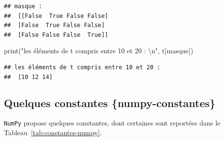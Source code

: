 \documentclass[12pt,]{book}
\newenvironment{Shaded}{\begin{snugshade}}{\end{snugshade}}
\newcommand{\CharTok}[1]{\textcolor[rgb]{0.31,0.60,0.02}{#1}}
\newcommand{\StringTok}[1]{\textcolor[rgb]{0.31,0.60,0.02}{#1}}
\newcommand{\BuiltInTok}[1]{#1}
\newcommand{\NormalTok}[1]{#1}
\numberwithin{equation}{section}
\numberwithin{countremarque}{section}
\begin{document}
\begin{lstlisting}
## masque : 
##  [[False  True False False]
##  [False  True False False]
##  [False False False  True]]
\end{lstlisting}

\begin{Shaded}
\begin{Highlighting}[]
\BuiltInTok{print}\NormalTok{(}\StringTok{"les éléments de t compris entre 10 et 20 : }\CharTok{\textbackslash{}n}\StringTok{"}\NormalTok{,}
\NormalTok{      t[masque])}
\end{Highlighting}
\end{Shaded}

\begin{lstlisting}
## les éléments de t compris entre 10 et 20 : 
##  [10 12 14]
\end{lstlisting}

\subsection{Quelques constantes
\{numpy-constantes\}}\label{quelques-constantes-numpy-constantes}

\texttt{NumPy} propose quelques constantes, dont certaines sont
reportées dans le Tableau~\ref{tab:constantes-numpy}.
\end{document}
